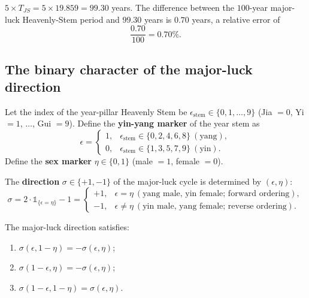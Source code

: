 \begin{example}\label{ex:dayun_js_100_yijing}
$5\times T_{JS}=5\times 19.859=99.30$ years. The difference between the $100$-year major-luck Heavenly-Stem period and $99.30$ years is $0.70$ years, a relative error of
\[
\frac{0.70}{100}=0.70\%.
\]
\end{example}

\subsection{The binary character of the major-luck direction}

\begin{definition}\label{def:year_stem_yin_yang_yijing}
Let the index of the year-pillar Heavenly Stem be $\epsilon_{\text{stem}}\in\{0,1,\dots,9\}$ (Jia $=0$, Yi $=1$, $\dots$, Gui $=9$). Define the \textbf{yin-yang marker} of the year stem as
\[
\epsilon=\begin{cases}1,&\epsilon_{\text{stem}}\in\{0,2,4,6,8\}\ (\text{yang}),\\0,&\epsilon_{\text{stem}}\in\{1,3,5,7,9\}\ (\text{yin}).\end{cases}
\]
Define the \textbf{sex marker} $\eta\in\{0,1\}$ (male $=1$, female $=0$).
\end{definition}

\begin{definition}\label{def:dayun_direction_yijing}
The \textbf{direction} $\sigma\in\{+1,-1\}$ of the major-luck cycle is determined by $(\epsilon,\eta)$:
\[
\sigma=2\cdot\mathbb 1_{\{\epsilon=\eta\}}-1=
\begin{cases}+1,&\epsilon=\eta\ (\text{yang male, yin female; forward ordering}),\\-1,&\epsilon\neq\eta\ (\text{yin male, yang female; reverse ordering}).\end{cases}
\]
\end{definition}

\begin{proposition}\label{prop:dayun_direction_duality_yijing}
The major-luck direction satisfies:
\begin{enumerate}[label=(\roman*)]
    \item $\sigma(\epsilon,1-\eta)=-\sigma(\epsilon,\eta)$;
    \item $\sigma(1-\epsilon,\eta)=-\sigma(\epsilon,\eta)$;
    \item $\sigma(1-\epsilon,1-\eta)=\sigma(\epsilon,\eta)$.
\end{enumerate}
\end{proposition}

